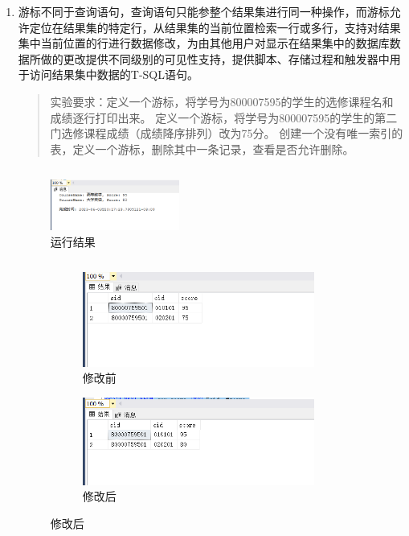 \documentclass[a4paper,twoside]{article}
\begin{document}
\begin{spacing}{1.2}
\begin{enumerate}
  \item 游标不同于查询语句，查询语句只能参整个结果集进行同一种操作，而游标允许定位在结果集的特定行，从结果集的当前位置检索一行或多行，支持对结果集中当前位置的行进行数据修改，为由其他用户对显示在结果集中的数据库数据所做的更改提供不同级别的可见性支持，提供脚本、存储过程和触发器中用于访问结果集中数据的T-SQL语句。
  \begin{quote}
    实验要求：定义一个游标，将学号为800007595的学生的选修课程名和成绩逐行打印出来。
定义一个游标，将学号为800007595的学生的第二门选修课程成绩（成绩降序排列）改为75分。
创建一个没有唯一索引的表，定义一个游标，删除其中一条记录，查看是否允许删除。
  \end{quote}
  \inputminted[firstline=235,lastline=256]{sql}{../code/1.sql}
  \begin{figure}[h]
    \centering
    \caption{运行结果}
    \includegraphics[width=0.4\textwidth]{images/10.png}
  \end{figure}
  \inputminted[firstline=260,lastline=281]{sql}{../code/1.sql}
  \begin{figure}[h]
    \centering
    \caption{运行结果}
    \begin{subfigure}{0.4\textwidth}
      \caption{修改前}
      \includegraphics[width=0.9\textwidth]{images/12.png}
    \end{subfigure}
    \begin{subfigure}{0.4\textwidth}
      \caption{修改后}
      \includegraphics[width=0.9\textwidth]{images/11.png}

\end{subfigure}
\end{figure}
\end{enumerate}
\end{spacing}
\end{document}
